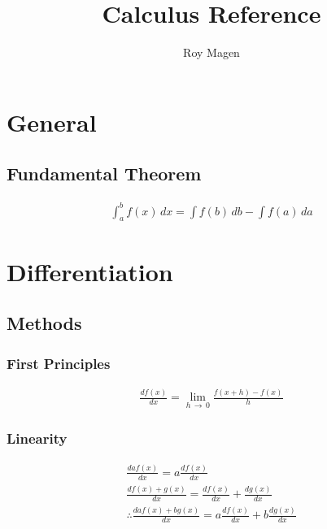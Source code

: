 \documentclass[12pt]{article}
\title{Calculus Reference}
\author{Roy Magen}
\date{ }
\numberwithin{equation}{subsubsection}
\begin{document}
	\newcommand{\differ}{d}

	\newcommand{\derivative}[2][x]{\frac{\differ #2}{\differ #1}}
	\newcommand{\integral}[2][x]{\int #2\,\differ #1}
	\newcommand{\arccsc}[0]{\,\text{arccsc}\,}
	\newcommand{\arcsec}[0]{\,\text{arcsec}\,}
	\newcommand{\arccot}[0]{\,\text{arccot}\,}

	\begin{titlepage}
	\maketitle
	\end{titlepage}
	
	\tableofcontents
	\pagebreak


	\section{General}
		\subsection{Fundamental Theorem}
			\begin{gather}
				\integral{_a^b f(x)} = \integral[b]{f(b)} - \integral[a]{f(a)}
			\end{gather}

	\section{Differentiation}
		\subsection{Methods}
			\subsubsection{First Principles}
				\begin{gather}
					\derivative{f(x)} = \lim_{h \,\to\, 0} \frac{f(x + h) - f(x)}{h}
				\end{gather}
			\subsubsection{Linearity}
				\begin{gather}
					\derivative{af(x)} = a\derivative{f(x)} \\
					\derivative{f(x) + g(x)} = \derivative{f(x)} +
					\derivative{g(x)} \\
					\therefore \derivative{af(x) + bg(x)} = a\derivative{f(x)}
					+ b\derivative{g(x)}
				\end{gather}
\end{document}
